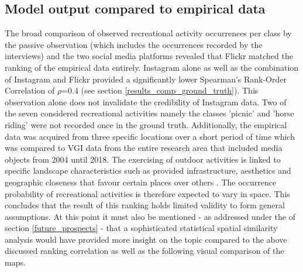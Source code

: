 \subsection{Model output compared to empirical data}
The broad comparison of observed recreational activity occurrences per class by the passive observation (which includes the occurrences recorded by the interviews) and the two social media platforms revealed that Flickr matched the ranking of the empirical data entirely. Instagram alone as well as the combination of Instagram and Flickr provided a significantly lower Spearman's Rank-Order Correlation of $\rho$=0.4 (see section \ref{results_comp_ground_truth}). This observation alone does not invalidate the credibility of Instagram data. Two of the seven considered recreational activities namely the classes 'picnic' and 'horse riding' were not recorded once in the ground truth. Additionally, the empirical data was acquired from three specific locations over a short period of time which was compared to VGI data from the entire research area that included media objects from 2004 until 2018. The exercising of outdoor activities is linked to specific landscape characteristics such as provided infrastructure, aesthetics and geographic closeness that favour certain places over others \parencite{Mancini2018}. The occurrence probability of recreational activities is therefore expected to vary in space. This concludes that the result of this ranking holds limited validity to form general assumptions. At this point it must also be mentioned - as addressed under the  of section \ref{future_prospects} - that a sophisticated statistical spatial similarity analysis would have provided more insight on the topic compared to the above discussed ranking correlation as well as the following visual comparison of the maps. \\

